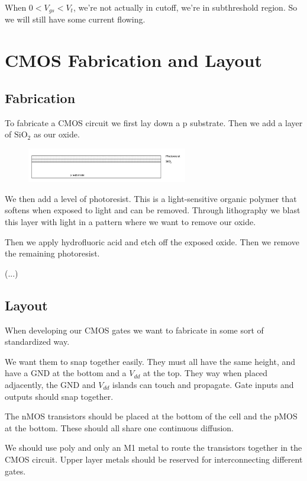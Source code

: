 \documentclass{article}
\begin{document}
When $0<V_{gs}<V_t$, we're not actually in cutoff, we're in subthreshold region. So we will still have some current flowing. 

\section{CMOS Fabrication and Layout}

\subsection{Fabrication}

To fabricate a CMOS circuit we first lay down a p substrate. Then we add a layer of $\mathrm{SiO_2}$ as our oxide. 

\begin{figure}[ht!]
\centering
\includegraphics[width=70mm]{fab1.png}
\end{figure}


We then add a level of photoresist. This is a light-sensitive organic polymer that softens when exposed to light and can be removed. Through lithography we blast this layer with light in a pattern where we want to remove our oxide. 

Then we apply hydrofluoric acid and etch off the exposed oxide. Then we remove the remaining photoresist. 

(...)

\subsection{Layout}

When developing our CMOS gates we want to fabricate in some sort of standardized way. 

We want them to snap together easily. They must all have the same height, and have a GND at the bottom and a $V_{dd}$ at the top. They way when placed adjacently, the GND and $V_{dd}$ islands can touch and propagate. Gate inputs and outputs should snap together. 

The nMOS transistors should be placed at the bottom of the cell and the pMOS at the bottom. These should all share one continuous diffusion. 

We should use poly and only an M1 metal to route the transistors together in the CMOS circuit. Upper layer metals should be reserved for interconnecting different gates. 
\end{document}
